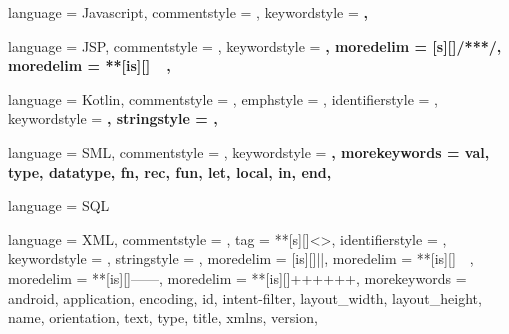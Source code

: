  {
	language = Javascript,
	commentstyle = \color{ashgrey},
	keywordstyle = \color{black}\bfseries,
}

 {
	language = JSP,
	commentstyle = \color{ashgrey},
	keywordstyle = \color{black}\bfseries,
	moredelim = [s][\color{ashgrey}]{/**}{*/},		%
	moredelim = **[is][\color{red}]{~}{~},			%
}

 {
	language = Kotlin,
	commentstyle = \color{gray}\ttfamily,
	emphstyle = {\color{OrangeRed}},
	identifierstyle = \color{black},
	keywordstyle = \color{NavyBlue}\bfseries,
	stringstyle = \color{ForestGreen}\ttfamily,
}

 {
	language = SML,
	commentstyle = \color{ashgrey},
	keywordstyle = \color{black}\bfseries,
	morekeywords = {
		val, type, datatype,
		fn, rec, fun,
		let, local, in, end,
	}
}

 {
	language = SQL
}

 {
	language = XML,
	commentstyle = \color{ashgrey},
	tag = **[s][\color{darkblue}\renewcommand\delimstyle{\color{black}}]<>,
	identifierstyle = \color{darkblue},
	keywordstyle = \color{cyan},
	stringstyle = \color{ForestGreen},
	moredelim = [is][\soutthick]{|}{|},
	moredelim = **[is][\color{red}]{~}{~},
	moredelim = **[is][\btHL]{---}{---},
	moredelim = **[is][{\btHL[fill=green!30]}]{+++}{+++},
	morekeywords = {
		android, application, encoding,
		id, intent-filter,
		layout_width, layout_height,
		name, orientation, text, type, title, xmlns, version,
	}
}
